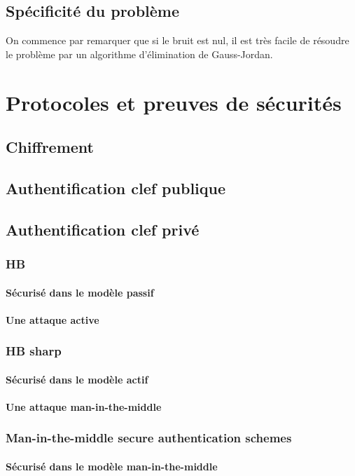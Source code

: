 \documentclass{article}		%
\theoremstyle{definition}
\theoremstyle{plain}
\begin{document}
\subsection{Spécificité du problème}
On commence par remarquer que si le bruit est nul, il est très facile de
résoudre le problème par un algorithme d'élimination de Gauss-Jordan.

\section{Protocoles et preuves de sécurités}
\subsection{Chiffrement}
\subsection{Authentification clef publique}
\cite{Dam}
\subsection{Authentification clef privé}
\subsubsection{HB}
\paragraph{Sécurisé dans le modèle passif}
\paragraph{Une attaque active}
\subsubsection{HB sharp}
\paragraph{Sécurisé dans le modèle actif}
\paragraph{Une attaque man-in-the-middle}
\subsubsection{Man-in-the-middle secure authentication schemes}
\paragraph{Sécurisé dans le modèle man-in-the-middle}
\end{document}
